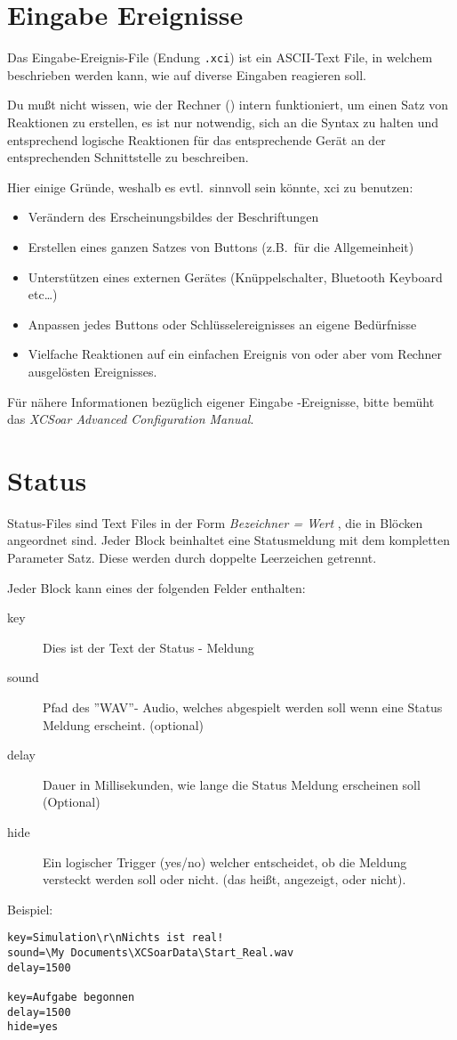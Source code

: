 \section{Eingabe Ereignisse}

Das Eingabe-Ereignis-File  (Endung \verb|.xci|) ist ein ASCII-Text File,
in welchem beschrieben werden kann, wie  \xc auf diverse Eingaben reagieren soll.

Du mußt nicht wissen, wie der Rechner (\xc) intern funktioniert, um einen Satz von
Reaktionen zu erstellen, es ist nur notwendig, sich an die Syntax zu halten und entsprechend logische
Reaktionen für das entsprechende Gerät an der entsprechenden Schnittstelle zu beschreiben.

Hier einige Gründe, weshalb es evtl.\ sinnvoll sein könnte, \textsf{xci} zu benutzen:
\begin{itemize}
\item Verändern des Erscheinungsbildes der   Beschriftungen
\item Erstellen eines ganzen Satzes von Buttons (z.B.\ für die Allgemeinheit)
\item Unterstützen eines externen Gerätes (Knüppelschalter, Bluetooth Keyboard etc\dots)
\item Anpassen jedes Buttons oder Schlüsselereignisses an eigene Bedürfnisse
\item Vielfache Reaktionen auf ein einfachen Ereignis von  \xc oder aber vom Rechner
ausgelösten Ereignisses.
\end{itemize}
Für nähere Informationen bezüglich eigener Eingabe -Ereignisse, bitte bemüht das {\em XCSoar Advanced Configuration Manual}.
\section{Status}\label{sec:status}
Status-Files sind Text Files in der Form  {\em Bezeichner  = Wert },
die in Blöcken  angeordnet sind. Jeder Block beinhaltet eine Statusmeldung
mit dem kompletten Parameter Satz.
Diese werden durch doppelte 
Leerzeichen getrennt.

Jeder Block kann eines der folgenden Felder enthalten:

\begin{description}
\item[key]  Dies ist der Text der Status - Meldung
\item[sound]  Pfad des ''\textsf{WAV}''- Audio, welches abgespielt werden soll
wenn eine Status Meldung erscheint. (optional)
\item[delay] Dauer in Millisekunden, wie lange die Status Meldung erscheinen soll (Optional)
\item[hide] Ein logischer Trigger (yes/no) welcher entscheidet, ob die Meldung
versteckt werden soll oder nicht. (das heißt, angezeigt, oder nicht).
\end{description}

Beispiel:
\begin{verbatim}
key=Simulation\r\nNichts ist real!
sound=\My Documents\XCSoarData\Start_Real.wav
delay=1500

key=Aufgabe begonnen
delay=1500
hide=yes
\end{verbatim}
%
